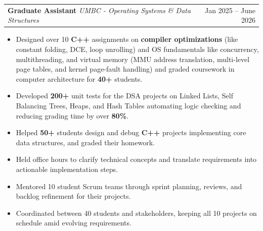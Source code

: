 \documentclass[letterpaper,11pt]{article}
\makeatletter
\newcommand{\SectionListBegin}{\begin{itemize}[leftmargin=0.15in, label={}]}
\newcommand{\BulletItems}[1]{
  \item
    \begin{itemize}[label={-}, leftmargin=*, labelsep=0.3em, topsep=0pt, partopsep=0pt, itemsep=0pt, parsep=0pt]
      \small #1
    \end{itemize}\vspace{-5pt}
}
\newcommand{\SLSubheadingItemThF}[3]{
  \vspace{-2pt}\item
    \begin{tabular*}{0.97\textwidth}[t]{l@{\extracolsep{\fill}}r}
      \textbf{#1} \textbar{} \textit{\small #2} & {\small #3} \\
    \end{tabular*}\vspace{-7pt}
}
\newcommand{\SLSubheadingItemLink}[4]{
  \vspace{-2pt}\item
    \begin{tabular*}{0.97\textwidth}[t]{l@{\extracolsep{\fill}}r}
      \textbf{\href{#2}{#1}} \textbar{} \textit{\small #3} & {\small #4} \\
    \end{tabular*}\vspace{-7pt}
}
\makeatother
\begin{document}
    \SLSubheadingItemThF
      {Graduate Assistant}
      {UMBC - Operating Systems \& Data Structures}
      {Jan 2025 -- June 2026}
    \BulletItems{
      \item Designed over 10 \textbf{C++} assignments on \textbf{compiler optimizations} (like constant folding, DCE, loop unrolling) and OS fundamentals like concurrency, multithreading, and virtual memory (MMU address translation, multi-level page tables, and kernel page-fault handling) and graded coursework in computer architecture for \textbf{40+} students.
      \item Developed \textbf{200+} unit tests for the DSA projects on Linked Lists, Self Balancing Trees, Heaps, and Hash Tables automating logic checking and reducing grading time by over \textbf{80\%}.
      \item Helped \textbf{50+} students design and debug \textbf{C++} projects implementing core data structures, and graded their homework.
      \item Held office hours to clarify technical concepts and translate requirements into actionable implementation steps.
      \item Mentored 10 student Scrum teams through sprint planning, reviews, and backlog refinement for their projects.
      \item Coordinated between 40 students and stakeholders, keeping all 10 projects on schedule amid evolving requirements.
     }

\end{document}
